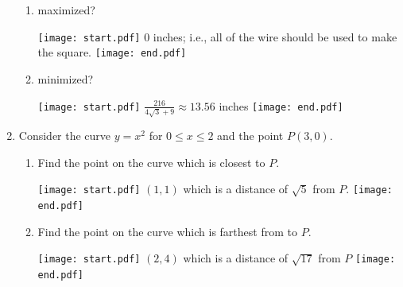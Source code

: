 \documentclass[12pt]{article}
\begin{document}
\begin{enumerate}
\begin{enumerate}

\item maximized?

\texttt{[image: start.pdf]}
{{0 inches; i.e., all of the wire should be used to make the square.}}
\texttt{[image: end.pdf]}


\item minimized?

\texttt{[image: start.pdf]}
{{$\frac{216}{4\sqrt{3}+9}\approx13.56$ inches}}
\texttt{[image: end.pdf]}


\end{enumerate}

\item Consider the curve $y=x^2$ for $0\leq x \leq 2$ and the point $P(3,0)$.

\begin{enumerate}

\item Find the point on the curve which is closest to $P$.

\texttt{[image: start.pdf]}
{{$(1,1)$ which is a distance of $\sqrt{5}$ from $P$.}}
\texttt{[image: end.pdf]}


\item Find the point on the curve which is farthest from to $P$.

\texttt{[image: start.pdf]}
{{$(2,4)$ which is a distance of $\sqrt{17}$ from $P$}}
\texttt{[image: end.pdf]}


\end{enumerate}

\end{enumerate}
\end{document}
